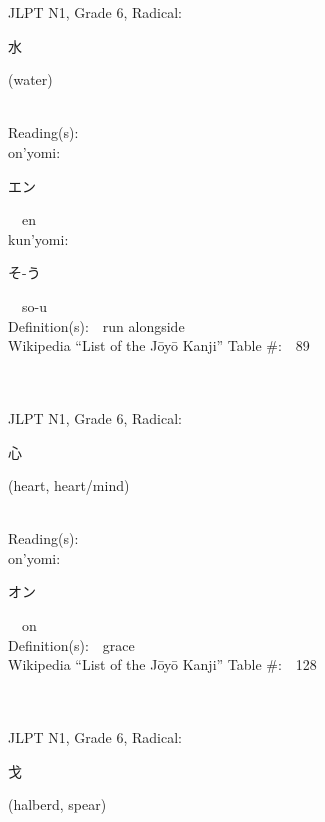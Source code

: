 \begin{multicols}{2}
{JLPT N1, Grade 6, Radical:\ \ {\begin{CJK}{UTF8}{min} 水 \end{CJK}} (water) } \\
Reading(s):\ \ \\
{\hspace*{1em}}on'yomi:\ \ \\
{\hspace*{2em}}{\begin{CJK}{UTF8}{min} エン \end{CJK}}\ \ en\ \ \\
{\hspace*{1em}}kun'yomi:\ \ \\
{\hspace*{2em}}{\begin{CJK}{UTF8}{min} そ-う \end{CJK}}\ \ so-u\ \ \\
Definition(s):\ \ run alongside \\
Wikipedia ``List of the J\=oy\=o Kanji'' Table \#:\ \ 89 \\
\ \ \\
{\fontsize{34pt}{40pt}  }\ \ \\  %
{JLPT N1, Grade 6, Radical:\ \ {\begin{CJK}{UTF8}{min} 心 \end{CJK}} (heart, heart/mind) } \\
Reading(s):\ \ \\
{\hspace*{1em}}on'yomi:\ \ \\
{\hspace*{2em}}{\begin{CJK}{UTF8}{min} オン \end{CJK}}\ \ on\ \ \\
Definition(s):\ \ grace \\
Wikipedia ``List of the J\=oy\=o Kanji'' Table \#:\ \ 128 \\
\ \ \\
{\fontsize{34pt}{40pt}  }\ \ \\  %
{JLPT N1, Grade 6, Radical:\ \ {\begin{CJK}{UTF8}{min} 戈 \end{CJK}} (halberd, spear) } \\

\end{multicols}
